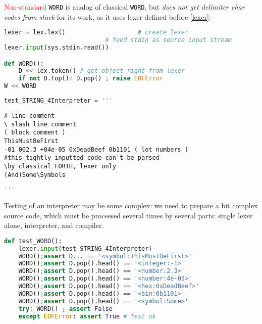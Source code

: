 \textcolor{red}{Non-standard} \verb|WORD| is analog of classical \verb|WORD|,
but \emph{does not get delimiter char codes from stack} for its work, as it uses
lexer defined before \ref{lexer}:
\begin{lstlisting}[language=Python]
lexer = lex.lex()              		 # create lexer
							# feed stdin as source input stream
lexer.input(sys.stdin.read())

def WORD():
    D << lex.token() # get object right from lexer
    if not D.top(): D.pop() ; raise EOFError
W << WORD
\end{lstlisting}
\clearpage\noindent
\begin{lstlisting}[language=Python]
test_STRING_4Interpreter = '''
\end{lstlisting}
\begin{lstlisting}[language=Forth]
# line comment
\ slash line comment
( block comment )
ThisMustBeFirst
-01 002.3 +04e-05 0xDeadBeef 0b1101 ( lot numbers )
#this tightly inputted code can't be parsed 
\by classical FORTH, lexer only
(And)Some\Symbols
\end{lstlisting}
\begin{lstlisting}[language=Python]
'''
\end{lstlisting}
Testing of an interpreter may be some complex: we need to prepare a bit complex
source code, which must be processed several times by several parts: single
lexer alone, interpreter, and compiler.
\begin{lstlisting}[language=Python]
def test_WORD():
	lexer.input(test_STRING_4Interpreter)
	WORD();assert D... == '<symbol:ThisMustBeFirst>'
	WORD();assert D.pop().head() == '<integer:-1>'
	WORD();assert D.pop().head() == '<number:2.3>'
	WORD();assert D.pop().head() == '<number:4e-05>'
	WORD();assert D.pop().head() == '<hex:0xDeadBeef>'
	WORD();assert D.pop().head() == '<bin:0b1101>'
	WORD();assert D.pop().head() == '<symbol:Some>'
	try: WORD() ; assert False
	except EOFError: assert True # test ok
\end{lstlisting}
    